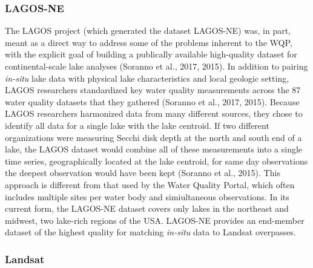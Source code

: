 \documentclass[]{article}
\begin{document}
\hypertarget{lagos-ne}{%
\subsubsection{LAGOS-NE}\label{lagos-ne}}

The LAGOS project (which generated the dataset LAGOS-NE) was, in part,
meant as a direct way to address some of the problems inherent to the
WQP, with the explicit goal of building a publically available
high-quality dataset for continental-scale lake analyses (Soranno et
al., 2017, 2015). In addition to pairing \emph{in-situ} lake data with
physical lake characteristics and local geologic setting, LAGOS
researchers standardized key water quality measurements across the 87
water quality datasets that they gathered (Soranno et al., 2017, 2015).
Because LAGOS researchers harmonized data from many different sources,
they chose to identify all data for a single lake with the lake
centroid. If two different organizations were measuring Secchi disk
depth at the north and south end of a lake, the LAGOS dataset would
combine all of these measurements into a single time series,
geographically located at the lake centroid, for same day observations
the deepest observation would have been kept (Soranno et al., 2015).
This approach is different from that used by the Water Quality Portal,
which often includes multiple sites per water body and simiultaneous
observations. In its current form, the LAGOS-NE dataset covers only
lakes in the northeast and midwest, two lake-rich regions of the USA.
LAGOS-NE provides an end-member dataset of the highest quality for
matching \emph{in-situ} data to Landsat overpasses.

\hypertarget{landsat}{%
\subsubsection{Landsat}\label{landsat}}
\end{document}
